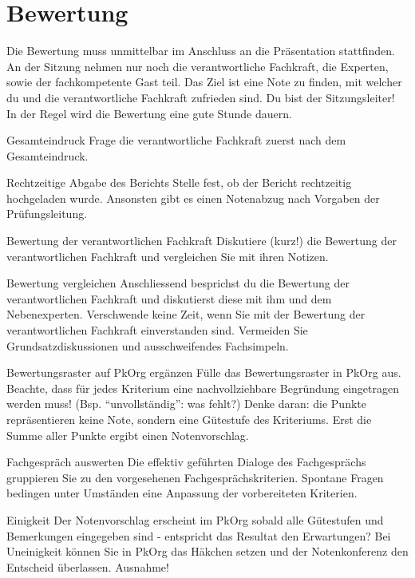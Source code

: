 \chapter{Bewertung}
Die Bewertung muss unmittelbar im Anschluss an die Präsentation stattfinden. An der Sitzung
nehmen nur noch die verantwortliche Fachkraft, die Experten, sowie der fachkompetente Gast teil. Das Ziel ist eine Note zu finden, mit welcher du und die verantwortliche Fachkraft zufrieden sind. Du bist der Sitzungsleiter! In der Regel wird die Bewertung eine gute Stunde dauern.

\begin{taskitem}{Gesamteindruck}
  Frage die verantwortliche Fachkraft zuerst nach dem Gesamteindruck.
\end{taskitem}
\begin{taskitem}{Rechtzeitige Abgabe des Berichts}
  Stelle fest, ob der Bericht rechtzeitig hochgeladen wurde. Ansonsten gibt es einen Notenabzug nach Vorgaben der Prüfungsleitung.
\end{taskitem}
\begin{taskitem}{Bewertung der verantwortlichen Fachkraft}
  Diskutiere (kurz!) die Bewertung der verantwortlichen Fachkraft und vergleichen Sie mit ihren Notizen.
\end{taskitem}
\begin{taskitem}{Bewertung vergleichen}
  Anschliessend besprichst du die Bewertung der verantwortlichen Fachkraft und diskutierst diese mit ihm und dem Nebenexperten. Verschwende keine Zeit, wenn Sie mit der Bewertung der verantwortlichen Fachkraft einverstanden sind. Vermeiden Sie Grundsatzdiskussionen und ausschweifendes Fachsimpeln.
\end{taskitem}
\begin{taskitem}{Bewertungsraster auf PkOrg ergänzen}
  Fülle das Bewertungsraster in PkOrg aus. Beachte, dass für jedes Kriterium eine nachvollziehbare Begründung eingetragen werden muss! (Bsp. \enquote{unvollständig}: was fehlt?) Denke daran: die Punkte repräsentieren keine Note, sondern eine Gütestufe des Kriteriums. Erst die Summe aller Punkte ergibt einen Notenvorschlag.
\end{taskitem}
\begin{taskitem}{Fachgespräch auswerten}
  Die effektiv geführten Dialoge des Fachgesprächs gruppieren Sie zu den vorgesehenen Fachgesprächskriterien. Spontane Fragen bedingen unter Umständen eine Anpassung der vorbereiteten Kriterien.
\end{taskitem}
\begin{taskitem}{Einigkeit}
  Der Notenvorschlag erscheint im PkOrg sobald alle Gütestufen und Bemerkungen eingegeben sind - entspricht das Resultat den Erwartungen? Bei Uneinigkeit können Sie in PkOrg das Häkchen setzen und der Notenkonferenz den Entscheid überlassen. Ausnahme!
\end{taskitem}
